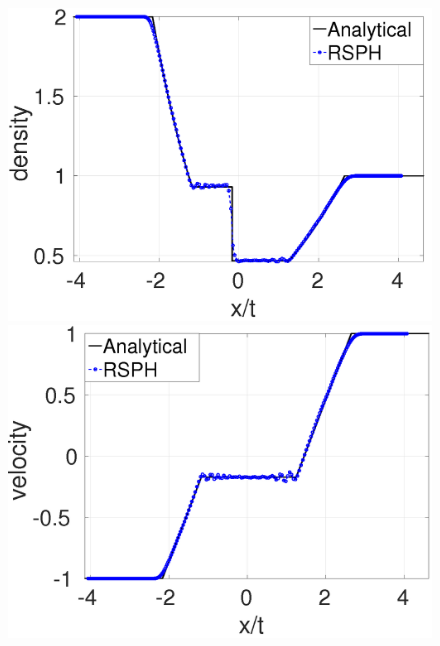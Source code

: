 \documentclass[review]{elsarticle}
\begin{document}
\begin{figure}[H]
    \centering
    \begin{minipage}{.415\textwidth}
        \centering
        \includegraphics[width=0.99 \textwidth]{./Figures/Dexp-RCM-rho}
    \end{minipage}%
    \begin{minipage}{.415 \textwidth}
        \centering
        \includegraphics[width=0.99 \textwidth]{./Figures/Dexp-RCM-v}
    \end{minipage}%
    \\
    \begin{minipage}{.415\textwidth}
        \centering

\end{minipage}
\end{figure}
\end{document}

